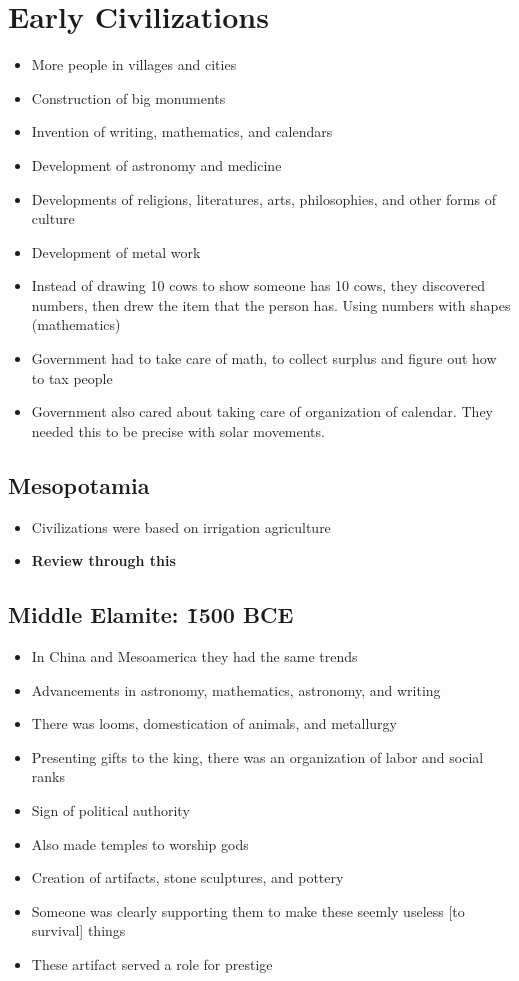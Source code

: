\documentclass{article}
\begin{document}
\section{Early Civilizations}
\begin{itemize}
  \item More people in villages and cities
  \item Construction of big monuments
  \item Invention of writing, mathematics, and calendars
  \item Development of astronomy and medicine
  \item Developments of religions, literatures, arts, philosophies,
    and other forms of culture
  \item Development of metal work
  \item Instead of drawing 10 cows to show someone has 10 cows,
    they discovered numbers, then drew the item that the person has.
    Using numbers with shapes (mathematics)
  \item Government had to take care of math,
    to collect surplus and figure out how to tax people
  \item Government also cared about taking care of organization
    of calendar. They needed this to be precise with solar movements.
\end{itemize}

\subsection{Mesopotamia}
\begin{itemize}
  \item Civilizations were based on irrigation agriculture
  \item \textbf{Review through this}
\end{itemize}

\subsection{Middle Elamite: \~1500 BCE}
\begin{itemize}
  \item In China and Mesoamerica they had the same trends
  \item Advancements in astronomy, mathematics, astronomy, and writing
  \item There was looms, domestication of animals, and
    metallurgy
  \item Presenting gifts to the king, there was an
    organization of labor and social ranks
  \item Sign of political authority
  \item Also made temples to worship gods
  \item Creation of artifacts, stone sculptures, and pottery
  \item Someone was clearly supporting them to make these
    seemly useless [to survival] things
  \item These artifact served a role for prestige
\end{itemize}
\end{document}

